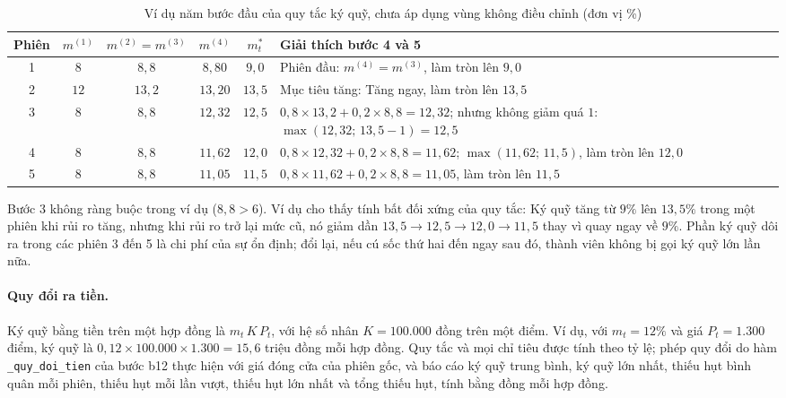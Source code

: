 \documentclass[12pt,a4paper]{article}
\theoremstyle{definition}
\theoremstyle{remark}
\begin{document}
\begin{table}[h]
\centering
\caption{Ví dụ năm bước đầu của quy tắc ký quỹ, chưa áp dụng vùng không điều chỉnh (đơn vị \%)}\label{tab:vidukyquy}
\begin{tabular}{@{}cccccp{6.8cm}@{}}
\toprule
\textbf{Phiên} & $m^{(1)}$ & $m^{(2)}=m^{(3)}$ & $m^{(4)}$ & $m^{\ast}_t$ & \textbf{Giải thích bước 4 và 5} \\
\midrule
1 & $8$ & $8{,}8$ & $8{,}80$ & $9{,}0$ & Phiên đầu: $m^{(4)}=m^{(3)}$, làm tròn lên $9{,}0$ \\
2 & $12$ & $13{,}2$ & $13{,}20$ & $13{,}5$ & Mục tiêu tăng: Tăng ngay, làm tròn lên $13{,}5$ \\
3 & $8$ & $8{,}8$ & $12{,}32$ & $12{,}5$ & $0{,}8\times13{,}2+0{,}2\times8{,}8=12{,}32$; nhưng không giảm quá $1$: $\max(12{,}32;\,13{,}5-1)=12{,}5$ \\
4 & $8$ & $8{,}8$ & $11{,}62$ & $12{,}0$ & $0{,}8\times12{,}32+0{,}2\times8{,}8=11{,}62$; $\max(11{,}62;\,11{,}5)$, làm tròn lên $12{,}0$ \\
5 & $8$ & $8{,}8$ & $11{,}05$ & $11{,}5$ & $0{,}8\times11{,}62+0{,}2\times8{,}8=11{,}05$, làm tròn lên $11{,}5$ \\
\bottomrule
\end{tabular}
\end{table}

Bước 3 không ràng buộc trong ví dụ ($8{,}8>6$). Ví dụ cho thấy tính bất đối xứng của quy tắc: Ký quỹ tăng từ $9\%$ lên $13{,}5\%$ trong một phiên khi rủi ro tăng, nhưng khi rủi ro trở lại mức cũ, nó giảm dần $13{,}5\to12{,}5\to12{,}0\to11{,}5$ thay vì quay ngay về $9\%$. Phần ký quỹ dôi ra trong các phiên 3 đến 5 là chi phí của sự ổn định; đổi lại, nếu cú sốc thứ hai đến ngay sau đó, thành viên không bị gọi ký quỹ lớn lần nữa.

\paragraph{Quy đổi ra tiền.} Ký quỹ bằng tiền trên một hợp đồng là $m_t\,K\,P_t$, với hệ số nhân $K=100.000$ đồng trên một điểm. Ví dụ, với $m_t=12\%$ và giá $P_t=1.300$ điểm, ký quỹ là $0{,}12\times100.000\times1.300=15{,}6$ triệu đồng mỗi hợp đồng. Quy tắc và mọi chỉ tiêu được tính theo tỷ lệ; phép quy đổi do hàm \texttt{\_quy\_doi\_tien} của bước b12 thực hiện với giá đóng cửa của phiên gốc, và báo cáo ký quỹ trung bình, ký quỹ lớn nhất, thiếu hụt bình quân mỗi phiên, thiếu hụt mỗi lần vượt, thiếu hụt lớn nhất và tổng thiếu hụt, tính bằng đồng mỗi hợp đồng.
\end{document}

